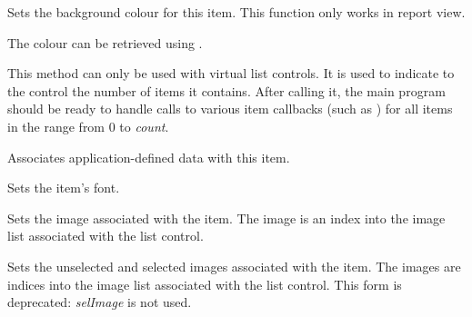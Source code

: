 
Sets the background colour for this item. This function only works in report view.

The colour can be retrieved using
.



\label{wxlistctrlsetitemcount}


This method can only be used with virtual list controls. It is used to indicate
to the control the number of items it contains. After calling it, the main
program should be ready to handle calls to various item callbacks (such as
) for all items in the range
from $0$ to {\it count}.


\label{wxlistctrlsetitemdata}


Associates application-defined data with this item.


\label{wxlistctrlsetitemfont}


Sets the item's font.


\label{wxlistctrlsetitemimage}


Sets the image associated with the item. The image is an index into the
image list associated with the list control.


Sets the unselected and selected images associated with the item. The images are indices into the
image list associated with the list control. This form is deprecated: {\it selImage} is not
used.


\label{wxlistctrlsetitemposition}


